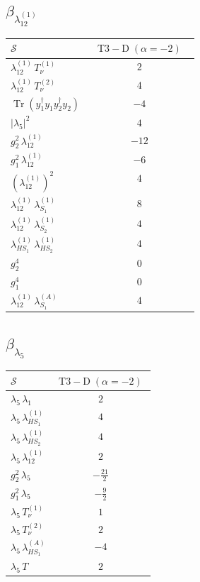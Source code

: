 \documentclass[9pt]{article}
\begin{document}
\subsection*{$ \beta_{\lambda_{12}^{(1)}} $}
\begin{longtable}{@{}p{0.31\linewidth}c@{}}
\toprule
$\mathcal{S}$ & $ \mathrm{T3-D}\;(\alpha=-2) $ \\
\midrule
$ \lambda_{12}^{(1)}\,T_{\nu}^{(1)} $ & $ 2 $ \\
$ \lambda_{12}^{(1)}\,T_{\nu}^{(2)} $ & $ 4 $ \\
$ \operatorname{Tr}(y_1^\dagger y_1y_2^\dagger y_2) $ & $ -4 $ \\
$ |\lambda_5|^2 $ & $ 4 $ \\
$ g_2^2\,\lambda_{12}^{(1)} $ & $ -12 $ \\
$ g_1^2\,\lambda_{12}^{(1)} $ & $ -6 $ \\
$ \left(\lambda_{12}^{(1)}\right)^2 $ & $ 4 $ \\
$ \lambda_{12}^{(1)}\,\lambda_{S_1}^{(1)} $ & $ 8 $ \\
$ \lambda_{12}^{(1)}\,\lambda_{S_2}^{(1)} $ & $ 4 $ \\
$ \lambda_{HS_1}^{(1)}\,\lambda_{HS_2}^{(1)} $ & $ 4 $ \\
$ g_2^4 $ & $ 0 $ \\
$ g_1^4 $ & $ 0 $ \\
$ \lambda_{12}^{(1)}\,\lambda_{S_1}^{(A)} $ & $ 4 $ \\
\bottomrule
\end{longtable}
\subsection*{$ \beta_{\lambda_5} $}
\begin{longtable}{@{}p{0.31\linewidth}c@{}}
\toprule
$\mathcal{S}$ & $ \mathrm{T3-D}\;(\alpha=-2) $ \\
\midrule
$ \lambda_5\,\lambda_1 $ & $ 2 $ \\
$ \lambda_5\,\lambda_{HS_1}^{(1)} $ & $ 4 $ \\
$ \lambda_5\,\lambda_{HS_2}^{(1)} $ & $ 4 $ \\
$ \lambda_5\,\lambda_{12}^{(1)} $ & $ 2 $ \\
$ g_2^2\,\lambda_5 $ & $ - \frac{21}{2} $ \\
$ g_1^2\,\lambda_5 $ & $ - \frac{9}{2} $ \\
$ \lambda_5\,T_{\nu}^{(1)} $ & $ 1 $ \\
$ \lambda_5\,T_{\nu}^{(2)} $ & $ 2 $ \\
$ \lambda_5\,\lambda_{HS_1}^{(A)} $ & $ -4 $ \\
$ \lambda_5\,T $ & $ 2 $ \\
\bottomrule
\end{longtable}
\end{document}

